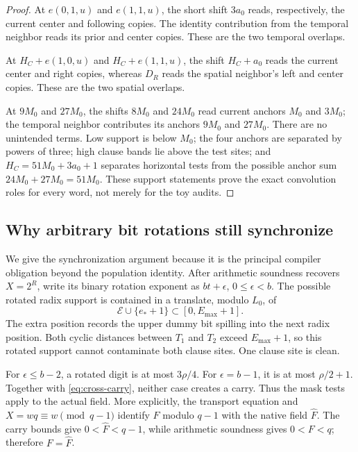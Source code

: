 \begin{proof}
At \(e(0,1,u)\) and \(e(1,1,u)\), the short shift \(3a_0\)
reads, respectively, the current center and following copies.
The identity contribution from the temporal neighbor reads its
prior and center copies. These are the two temporal overlaps.

At \(H_C+e(1,0,u)\) and \(H_C+e(1,1,u)\), the shift \(H_C+a_0\)
reads the current center and right copies, whereas \(D_R\)
reads the spatial neighbor's left and center copies. These are
the two spatial overlaps.

At \(9M_0\) and \(27M_0\), the shifts \(8M_0\) and \(24M_0\)
read current anchors \(M_0\) and \(3M_0\); the temporal neighbor
contributes its anchors \(9M_0\) and \(27M_0\).
There are no unintended terms. Low support is below \(M_0\);
the four anchors are separated by powers of three; high clause
bands lie above the test sites; and
\(H_C=51M_0+3a_0+1\) separates horizontal tests from the possible
anchor sum \(24M_0+27M_0=51M_0\).
These support statements prove the exact convolution roles for
every word, not merely for the toy audits.
\end{proof}

\subsection{Why arbitrary bit rotations still synchronize}

We give the synchronization argument because it is the principal
compiler obligation beyond the population identity.
After arithmetic soundness recovers \(X=2^R\), write its binary
rotation exponent as \(bt+\epsilon\), \(0\le\epsilon<b\).
The possible rotated radix support is contained in a translate,
modulo \(L_0\), of
\[
 \mathcal E\cup\{e_*+1\}\subset[0,E_{\max}+1].
\]
The extra position records the upper dummy bit spilling into the
next radix position. Both cyclic distances between \(T_1\) and
\(T_2\) exceed \(E_{\max}+1\), so this rotated support cannot
contaminate both clause sites. One clause site is clean.

For \(\epsilon\le b-2\), a rotated digit is at most \(3\rho/4\).
For \(\epsilon=b-1\), it is at most \(\rho/2+1\).
Together with \eqref{eq:cross-carry}, neither case creates a carry.
Thus the mask tests apply to the actual field. More explicitly,
the transport equation and \(X=wq\equiv w\pmod{q-1}\) identify
\(F\) modulo \(q-1\) with the native field \(\widehat F\).
The carry bounds give \(0<\widehat F<q-1\), while arithmetic
soundness gives \(0<F<q\); therefore \(F=\widehat F\).

